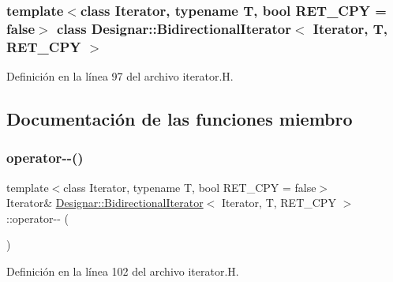 \subsubsection*{template$<$class Iterator, typename T, bool R\+E\+T\+\_\+\+C\+PY = false$>$\newline
class Designar\+::\+Bidirectional\+Iterator$<$ Iterator, T, R\+E\+T\+\_\+\+C\+P\+Y $>$}



Definición en la línea 97 del archivo iterator.\+H.



\subsection{Documentación de las funciones miembro}
\mbox{\label{class_designar_1_1_bidirectional_iterator_aac9847e9868e270c4266a6fa0323a6ef}} 
\subsubsection{\texorpdfstring{operator-\/-\/()}{operator--()}\hspace{0.1cm}{\footnotesize\ttfamily [1/2]}}
{\footnotesize\ttfamily template$<$class Iterator, typename T, bool R\+E\+T\+\_\+\+C\+PY = false$>$ \\
Iterator\& \hyperlink{class_designar_1_1_bidirectional_iterator}{Designar\+::\+Bidirectional\+Iterator}$<$ Iterator, T, R\+E\+T\+\_\+\+C\+PY $>$\+::operator-\/-\/ (\begin{DoxyParamCaption}{ }\end{DoxyParamCaption})\hspace{0.3cm}{\ttfamily [inline]}}



Definición en la línea 102 del archivo iterator.\+H.

\mbox{\label{class_designar_1_1_bidirectional_iterator_a71602759debbdd18c89ffddb2217acb3}} 
